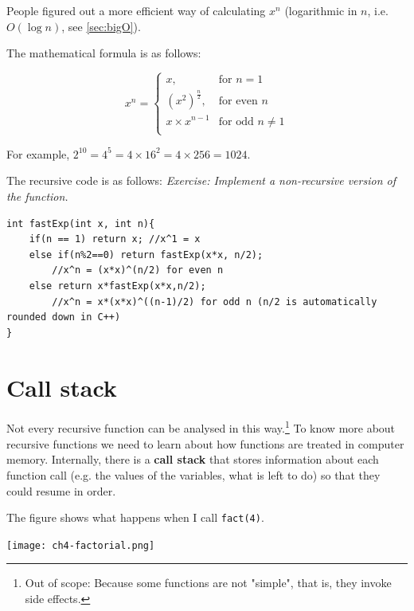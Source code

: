 People figured out a more efficient way of calculating $x^n$ (logarithmic in $n$, i.e. $O(\log n)$, see \cref{sec:bigO}). 

The mathematical formula is as follows:

\[
    x^n = \begin{cases}
    x, & \text{for } n = 1 \\
    (x^2)^{\frac{n}{2}}, & \text{for even } n \\
    x \times x^{n-1} & \text{for odd } n \neq 1\\
    \end{cases}
\]




For example, $2^{10} = 4^5 = 4\times 16^2 = 4\times 256 = 1024$.

The recursive code is as follows: \textit{Exercise: Implement a non-recursive version of the function.}

\begin{lstlisting}
int fastExp(int x, int n){
    if(n == 1) return x; //x^1 = x
    else if(n%2==0) return fastExp(x*x, n/2); 
        //x^n = (x*x)^(n/2) for even n
    else return x*fastExp(x*x,n/2); 
        //x^n = x*(x*x)^((n-1)/2) for odd n (n/2 is automatically rounded down in C++)
}
\end{lstlisting}

\section{Call stack}

Not every recursive function can be analysed in this way.\footnote{Out of scope: Because some functions are not "simple", that is, they invoke side effects.} To know more about recursive functions we need to learn about how functions are treated in computer memory. Internally, there is a \textbf{call stack} that stores information about each function call (e.g. the values of the variables, what is left to do) so that they could resume in order.

The figure shows what happens when I call \texttt{fact(4)}.

\texttt{[image: ch4-factorial.png]}

